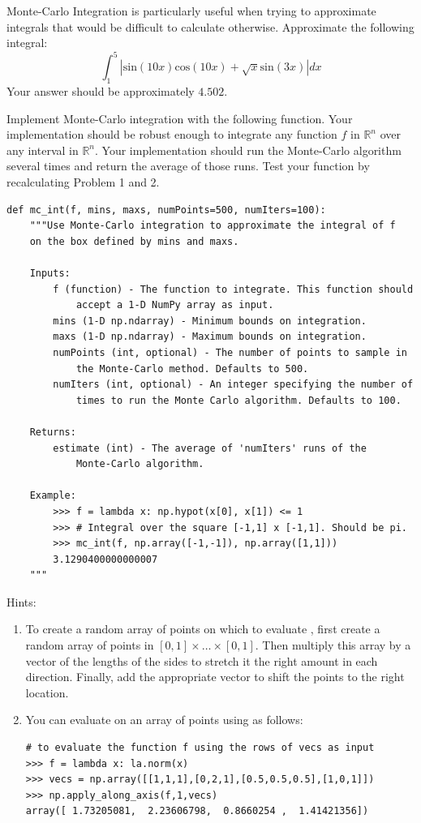 \begin{problem}
\label{prob:crazy_sine}
Monte-Carlo Integration is particularly useful when trying to approximate integrals that would be difficult to calculate otherwise. Approximate the following integral:
$$\int_{1}^{5} \left | \text{sin}(10x)\text{cos}(10x) + \sqrt{x}\text{sin}(3x) \right | dx$$
Your answer should be approximately $4.502$.
\end{problem}

\begin{problem}
\label{prob:mc}
Implement Monte-Carlo integration with the following function. Your implementation should be robust enough to integrate any function $f$ in $\mathbb{R}^n$ over any interval in $\mathbb{R}^n$.
Your implementation should run the Monte-Carlo algorithm several times 
and return the average of those runs. Test your function by recalculating Problem 1 and 2.
\begin{lstlisting}
def mc_int(f, mins, maxs, numPoints=500, numIters=100):
    """Use Monte-Carlo integration to approximate the integral of f
    on the box defined by mins and maxs.
    
    Inputs:
        f (function) - The function to integrate. This function should 
            accept a 1-D NumPy array as input.
        mins (1-D np.ndarray) - Minimum bounds on integration.
        maxs (1-D np.ndarray) - Maximum bounds on integration.
        numPoints (int, optional) - The number of points to sample in 
            the Monte-Carlo method. Defaults to 500.
        numIters (int, optional) - An integer specifying the number of 
            times to run the Monte Carlo algorithm. Defaults to 100.
        
    Returns:
        estimate (int) - The average of 'numIters' runs of the 
            Monte-Carlo algorithm.
                
    Example:
        >>> f = lambda x: np.hypot(x[0], x[1]) <= 1
        >>> # Integral over the square [-1,1] x [-1,1]. Should be pi.
        >>> mc_int(f, np.array([-1,-1]), np.array([1,1]))
        3.1290400000000007
    """
\end{lstlisting}

Hints:
\begin{enumerate}
\item To create a random array of points on which to evaluate , first create a random array of points in $[0,1] \times \ldots \times [0,1]$.
Then multiply this array by a vector of the lengths of the sides to stretch it the right amount in each direction.
Finally, add the appropriate vector to shift the points to the right location.
\item You can evaluate  on an array of points using  as follows:
\begin{lstlisting}
# to evaluate the function f using the rows of vecs as input
>>> f = lambda x: la.norm(x)
>>> vecs = np.array([[1,1,1],[0,2,1],[0.5,0.5,0.5],[1,0,1]])
>>> np.apply_along_axis(f,1,vecs)
array([ 1.73205081,  2.23606798,  0.8660254 ,  1.41421356])
\end{lstlisting}

\end{enumerate}
\end{problem}

